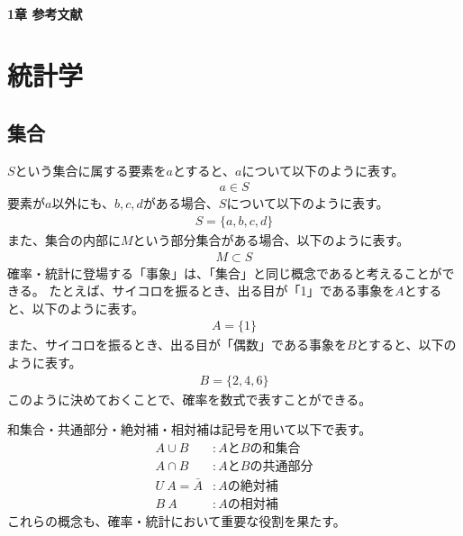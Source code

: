 \documentclass{ltjsarticle}
\begin{document}
\paragraph{1章 参考文献}

\newpage

\section{統計学}
\subsection{集合}
$S$という集合に属する要素を$a$とすると、$a$について以下のように表す。
\begin{align}
a \in S
\end{align}
要素が$a$以外にも、$b, c, d$がある場合、$S$について以下のように表す。
\begin{align}
S = \{a, b, c, d\}
\end{align}
また、集合の内部に$M$という部分集合がある場合、以下のように表す。
\begin{align}
M \subset S
\end{align}
確率・統計に登場する「事象」は、「集合」と同じ概念であると考えることができる。
たとえば、サイコロを振るとき、出る目が「1」である事象を$A$とすると、以下のように表す。
\begin{align}
A = \{1\}
\end{align}
また、サイコロを振るとき、出る目が「偶数」である事象を$B$とすると、以下のように表す。
\begin{align}
B = \{2, 4, 6\}
\end{align}
このように決めておくことで、確率を数式で表すことができる。

\par
和集合・共通部分・絶対補・相対補は記号を用いて以下で表す。
\begin{align}
A \cup B & : A \text{と} B \text{の和集合} \\
A \cap B & : A \text{と} B \text{の共通部分} \\
U \ A = \bar{A} & : A \text{の絶対補} \\
B \ A & : A \text{の相対補}
\end{align}
これらの概念も、確率・統計において重要な役割を果たす。
\end{document}
